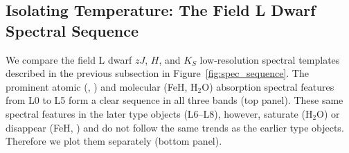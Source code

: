 \documentclass[12pt,preprint]{aastex}
\begin{document}
\subsection{Isolating Temperature: The Field L Dwarf Spectral Sequence}
\label{sec:temp}
We compare the field L dwarf $zJ$, $H$, and $K_S$ low-resolution spectral templates described in the previous subsection in Figure~\ref{fig:spec_sequence}.
The prominent atomic (, ) and molecular (FeH, H$_2$O) absorption spectral features from L0 to L5 form a clear sequence in all three bands (top panel).
These same spectral features in the later type objects (L6--L8), however, saturate (H$_2$O) or disappear (FeH, ) and do not follow the same trends as the earlier type objects. Therefore we plot them separately (bottom panel).

\end{document}
